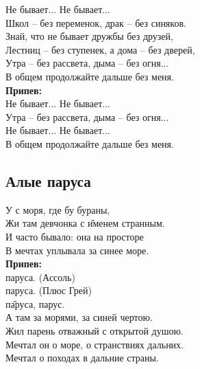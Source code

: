 \documentclass[fleqn,a5paper,12pt,twoside]{guitartabs}
\newcommand{\musVspace}{\vspace{2mm}}
\begin{document}
    \-\hspace{10mm}Не бывает... Не бывает...\\
    \-\hspace{10mm}Школ -- без переменок, драк -- без синяков.\musVspace\\
    Знай, что не бывает дружбы без друзей,\\
    Лестниц -- без ступенек, а дома -- без дверей,\\
    Утра -- без рассвета, дыма -- без огня...\\
    В общем продолжайте дальше без меня.\musVspace\\
    \-\hspace{10mm}\textbf{Припев:}\\
    \-\hspace{10mm}Не бывает... Не бывает...\\
    \-\hspace{10mm}Утра -- без рассвета, дыма -- без огня...\\
    \-\hspace{10mm}Не бывает... Не бывает...\\
    \-\hspace{10mm}В общем продолжайте дальше без меня.\\
\newpage
{}%
\subsection*{Алые паруса}
    У с моря, где бу бураны,\\
    Жи там девчонка с \G{именем} странным.\\
    И часто бывало: она на просторе \\
    В мечтах уплывала за синее море.\\
    
    \-\hspace{10mm}\textbf{Припев:}\\
    \-\hspace{10mm} паруса. (Ассоль)     \\           
    \-\hspace{10mm} паруса. (Плюс Грей) \\             
    \-\hspace{10mm} п\G{аруса}, парус.\\
    
    А там за морями, за синей чертою.\\
    Жил парень отважный с открытой душою.\\
    Мечтал он о море, о странствиях дальних.\\
    Мечтал о походах в дальние страны.\\
    
\end{document}

